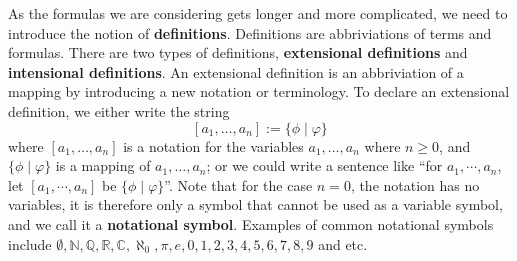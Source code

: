\documentclass[11pt]{book}
\begin{document}
\fi
As the formulas we are considering gets longer and more complicated, we need to introduce the notion of \textbf{definitions}. Definitions are abbriviations of terms and formulas. There are two types of definitions, \textbf{extensional definitions} and \textbf{intensional definitions}. An extensional definition is an abbriviation of a mapping by introducing a new notation or terminology. To declare an extensional definition, we either write the string
\[[a_1,\dots,a_n]:=\{\phi\mid \varphi\}\]
where $[a_1,\dots,a_n]$ is a notation for the variables $a_1,\dots,a_n$ where $n\ge 0$, and $\{\phi\mid \varphi\}$ is a mapping of $a_1,\dots,a_n$; or we could write a sentence like ``for $a_1,\cdots,a_n$, let $[a_1,\cdots,a_n]$ be $\{\phi\mid \varphi\}$''. Note that for the case $n=0$, the notation has no variables, it is therefore only a symbol that cannot be used as a variable symbol, and we call it a \textbf{notational symbol}. Examples of common notational symbols include $\emptyset,\mathbb{N},\mathbb{Q},\mathbb{R},\mathbb{C},\aleph_0,\pi,e,0,1,2,3,4,5,6,7,8,9$ and etc.
\end{document}

